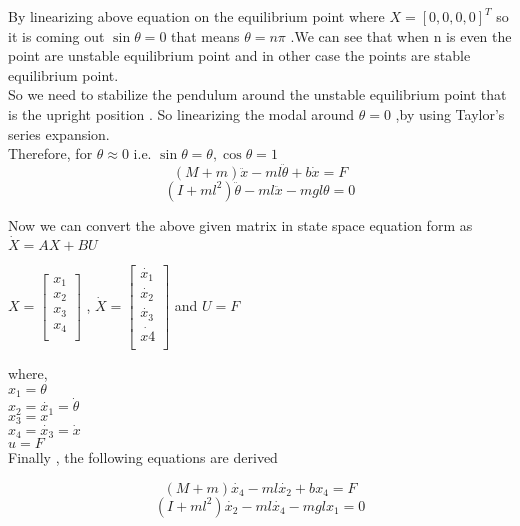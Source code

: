 \documentclass[11pt]{article}
\begin{document}
\begin{flushleft} {
By linearizing above equation on the equilibrium point where $X = [0, 0, 0, 0]^T$ so it is coming out $\sin{\theta} = 0 $ that means $\theta = n\pi$ .We can see that when n is even the point are unstable equilibrium point and in other case the points are stable equilibrium point.\\
So we need to stabilize the pendulum around the unstable equilibrium point that is the upright position . So linearizing the modal around $\theta = 0$ ,by using Taylor's series expansion.\\
Therefore, for $\theta \approx 0 $ i.e. $\sin{\theta} = \theta , \cos{\theta} = 1$
}
\begin{equation}
(M+m)\ddot{x} - ml\ddot{\theta} + b\dot{x} = F
\end{equation}
\begin{equation}
(I+ml^2)\ddot{\theta} - ml\ddot{x} - mgl\theta = 0
\end{equation}

{Now we can convert the above given matrix in state space equation form as $\dot{X} = AX + BU$\\}
\begin{center}
   $X=\begin{bmatrix}
x_1\\x_2\\x_3\\x_4\\
\end{bmatrix} $ ,
$\dot{X} =\begin{bmatrix}
 \dot{x_1}\\ \dot{x_2}\\ \dot{x_3} \\ \dot{x4}\\
 \end{bmatrix}$ and $U=F$
\end{center}

{where, \\
$x_1 = \theta $ \\
$x_2 = \dot{x_1} = \dot{\theta}$ \\
$x_3 = x$ \\
$x_4 = \dot{x_3} = \dot{x}$ \\
$u=F$\\
Finally , the following equations are derived
}

\begin{equation}
(M+m)\dot{x_4} - ml\dot{x_2} + bx_4 = F
\end{equation}
\begin{equation}
(I+ml^2)\dot{x_2} - ml\dot{x_4} - mglx_1 = 0
\end{equation}


\end{flushleft}
\end{document}
